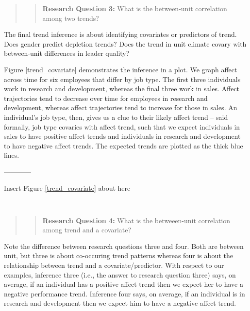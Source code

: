 \documentclass[english,,man]{apa6}
\theoremstyle{definition}
\theoremstyle{definition}
\theoremstyle{definition}
\theoremstyle{remark}
\begin{document}
\begin{quote}
\begin{quote}
\textbf{Research Question 3:} What is the between-unit correlation among
two trends?
\end{quote}
\end{quote}

The final trend inference is about identifying covariates or predictors
of trend. Does gender predict depletion trends? Does the trend in unit
climate covary with between-unit differences in leader quality?

Figure \ref{trend_covariate} demonstrates the inference in a plot. We
graph affect across time for six employees that differ by job type. The
first three individuals work in research and development, whereas the
final three work in sales. Affect trajectories tend to decrease over
time for employees in research and development, whereas affect
trajectories tend to increase for those in sales. An individual's job
type, then, gives us a clue to their likely affect trend -- said
formally, job type covaries with affect trend, such that we expect
individuals in sales to have positive affect trends and individuals in
research and development to have negative affect trends. The expected
trends are plotted as the thick blue lines.

\begin{center}

------------

Insert Figure \ref{trend_covariate} about here

------------

\end{center}

\begin{quote}
\begin{quote}
\textbf{Research Question 4:} What is the betweeen-unit correlation
among trend and a covariate?
\end{quote}
\end{quote}

Note the difference between research questions three and four. Both are
between unit, but three is about co-occuring trend patterns whereas four
is about the relationship between trend and a covariate/predictor. With
respect to our examples, inference three (i.e., the answer to research
question three) says, on average, if an individual has a positive affect
trend then we expect her to have a negative performance trend. Inference
four says, on average, if an individual is in research and development
then we expect him to have a negative affect trend.
\end{document}
